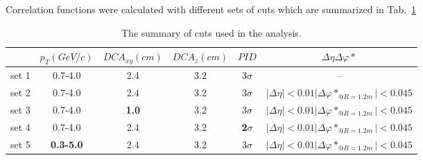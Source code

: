 Correlation functions were calculated with different sets of cuts which are summarized in Tab.~\ref{cuts}
\begin{table}[h]
  \begin{tabularx}{\textwidth}{|X|c|c|c|c|c|} \hline
    \centering
    \centering
     &   $p_T (GeV/c)$ &  $DCA_{xy} (cm)$   &  $DCA_{z} (cm)$ &  $PID$ &  $\Delta \eta \Delta \varphi*$ \\ \hline
     set 1 &   0.7-4.0 &  2.4   &  3.2 & 3$\sigma$ &  -- \\ \hline
     set 2 &   0.7-4.0 &  2.4   &  3.2 & 3$\sigma$ &  $|\Delta \eta| < 0.01  |\Delta \varphi*_{@R=1.2m}| < 0.045$ \\ \hline
     set 3 &   0.7-4.0 &  \bf 1.0   &  3.2 & 3$\sigma$ &  $|\Delta \eta| < 0.01  |\Delta \varphi*_{@R=1.2m}| < 0.045$ \\ \hline
     set 4 &   0.7-4.0 &  2.4   &  3.2 & \bf 2$\sigma$ &  $|\Delta \eta| < 0.01  |\Delta \varphi*_{@R=1.2m}| < 0.045$ \\ \hline
     set 5 &   \bf 0.3-5.0 &  2.4   &  3.2 & 3$\sigma$ &  $|\Delta \eta| < 0.01  |\Delta \varphi*_{@R=1.2m}| < 0.045$ \\ \hline
  \end{tabularx}
  \caption{The summary of cuts used in the analysis.}
  \label{cuts}
\end{table}


